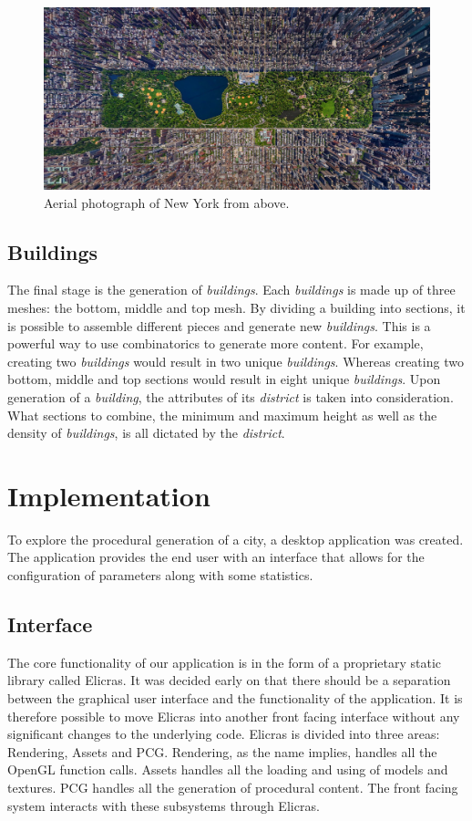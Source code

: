	\begin{figure}[h]
		\centering
		\includegraphics[width=0.9\linewidth]{"Images/new york"}
		\caption{Aerial photograph of New York from above.}
		\label{fig:new-york}
	\end{figure}
		
	\subsection{Buildings}
	The final stage is the generation of \textit{buildings}. Each \textit{buildings} is made up of three meshes: the bottom, middle and top mesh. By dividing a building into sections, it is possible to assemble different pieces and generate new \textit{buildings}. This is a powerful way to use combinatorics to generate more content. For example, creating two \textit{buildings} would result in two unique \textit{buildings}. Whereas creating two bottom, middle and top sections would result in eight unique \textit{buildings}. Upon generation of a \textit{building}, the attributes of its \textit{district} is taken into consideration. What sections to combine, the minimum and maximum height as well as the density of \textit{buildings}, is all dictated by the \textit{district}.

\section{Implementation}
To explore the procedural generation of a city, a desktop application was created. The application provides the end user with an interface that allows for the configuration of parameters along with some statistics. 
	
	\subsection{Interface}
	The core functionality of our application is in the form of a proprietary static library called Elicras. It was decided early on that there should be a separation between the graphical user interface and the functionality of the application. It is therefore possible to move Elicras into another front facing interface without any significant changes to the underlying code. Elicras is divided into three areas: Rendering, Assets and PCG. Rendering, as the name implies, handles all the OpenGL function calls. Assets handles all the loading and using of models and textures. PCG handles all the generation of procedural content. The front facing system interacts with these subsystems through Elicras.
		
